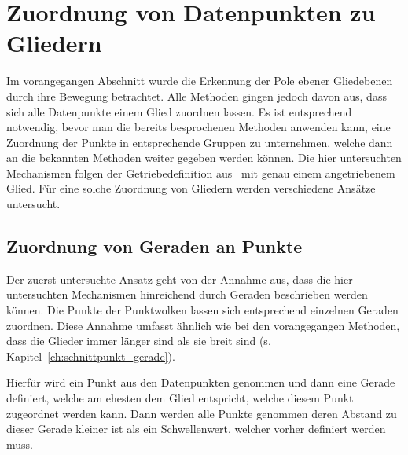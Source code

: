 
\chapter{Zuordnung von Datenpunkten zu Gliedern} \label{ch:gruppierung_von_datenpunkten}


Im vorangegangen Abschnitt wurde die Erkennung der Pole ebener Gliedebenen durch ihre Bewegung betrachtet.
Alle Methoden gingen jedoch davon aus, dass sich alle Datenpunkte einem Glied zuordnen lassen.
Es ist entsprechend notwendig, bevor man die bereits besprochenen Methoden anwenden kann, eine Zuordnung der Punkte in entsprechende Gruppen zu unternehmen, welche dann an die bekannten Methoden weiter gegeben werden können.
Die hier untersuchten Mechanismen folgen der Getriebedefinition aus~\cite[G167]{Grote2014} mit genau einem angetriebenem Glied.
Für eine solche Zuordnung von Gliedern werden verschiedene Ansätze untersucht.

\section{Zuordnung von Geraden an Punkte}\label{ch:naive_grouping_approach}

Der zuerst untersuchte Ansatz geht von der Annahme aus, dass die hier untersuchten Mechanismen hinreichend durch Geraden beschrieben werden können.
Die Punkte der Punktwolken lassen sich entsprechend einzelnen Geraden zuordnen.
Diese Annahme umfasst ähnlich wie bei den vorangegangen Methoden, dass die Glieder immer länger sind als sie breit sind (s. Kapitel~\ref{ch:schnittpunkt_gerade}).

Hierfür wird ein Punkt aus den Datenpunkten genommen und dann eine Gerade definiert, welche am ehesten dem Glied entspricht, welche diesem Punkt zugeordnet werden kann.
Dann werden alle Punkte genommen deren Abstand zu dieser Gerade kleiner ist als ein Schwellenwert, welcher vorher definiert werden muss.

